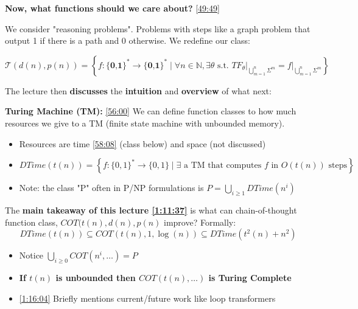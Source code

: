 \documentclass[12pt, twoside]{article}
\begin{document}
\newpage
\textbf{Now, what functions should we care about?} \href{https://youtu.be/hzkRibaG3xU?si=E-MZnOr3eWipVv9I&t=2989}{[49:49]}

We consider "reasoning problems". Problems with steps like a graph problem that output 1 if there is a path and 0 otherwise. We redefine our class:

\begin{definition}
    $$
    \mathcal{T}(d(n), p(n)) = \left\{
    f: \textbf{\{0,1\}}^* \to \textbf{\{0,1\}}^* \mid \forall n \in \mathbb{N}, \exists \theta \text{ s.t. }
    \left. TF_\theta \right|_{\bigcup_{m=1}^n \Sigma^m} = \left. f \right|_{\bigcup_{m=1}^n \Sigma^m}
    \right\}
    $$
\end{definition}

The lecture then \textbf{discusses} the \textbf{intuition} and \textbf{overview} of what next:

\vspace{0.5cm}

\textbf{Turing Machine (TM):} \href{https://youtu.be/hzkRibaG3xU?si=7cm22VcpRcPOV8Ft}{[56:00]} We can define function classes to how much resources we give to a TM (finite state machine with unbounded memory).
\begin{itemize}
    \item Resources are time \href{https://youtu.be/hzkRibaG3xU?si=Q9Tl8uAS2qtgvRs0}{[58:08]} (class below) and space (not discussed)
    \item \small $DTime(t(n)) = \left\{ f: \{0,1\}^* \to \{0,1\} \mid \exists \text{ a TM that computes } f \text{ in } O(t(n)) \text{ steps} \right\}$
    \item \normalsize Note: the class "P" often in P/NP formulations is $P = \bigcup_{i \geq 1} DTime(n^i)$
\end{itemize}

\vspace{0.5cm}

The \textbf{main takeaway of this lecture \href{https://youtu.be/hzkRibaG3xU?si=P2letdHwZ9f0P4Uh&t=4297}{[1:11:37]}} is what can chain-of-thought function class, $COT(t(n), d(n),p(n)$ improve? Formally:
$$DTime(t(n)) \subseteq COT(t(n), 1, \log(n)) \subseteq DTime(t^2(n)+n^2)$$
\begin{itemize}
    \item Notice $\bigcup_{i \geq0}COT(n^i, \dots)=P$
    \item \textbf{If $t(n)$ is unbounded then $COT(t(n),\dots)$ is Turing Complete}
    \item \href{https://youtu.be/hzkRibaG3xU?si=WiZlnsh6q3kw9StD&t=4564}{[1:16:04]} Briefly mentions current/future work like loop transformers \cite{merrill2025exact}
\end{itemize}
\end{document}
